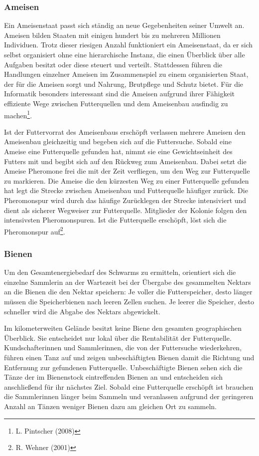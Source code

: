 \documentclass[a4paper, 11pt]{article}
\begin{document}
\subsubsection{Ameisen}
Ein Ameisenstaat passt sich ständig an neue Gegebenheiten seiner Umwelt an. Ameisen bilden Staaten mit einigen hundert bis zu mehreren Millionen Individuen. Trotz dieser riesigen Anzahl funktioniert ein Ameisenstaat, da er sich selbst organisiert ohne eine hierarchische Instanz, die einen Überblick über alle Aufgaben besitzt oder diese steuert und verteilt. Stattdessen führen die Handlungen einzelner Ameisen im Zusammenspiel zu einem organisierten Staat, der für die Ameisen sorgt und Nahrung, Brutpflege und Schutz bietet. Für die Informatik besonders interessant sind die Ameisen aufgrund ihrer Fähigkeit effiziente Wege zwischen Futterquellen und dem Ameisenbau ausfindig zu machen\footnote{L. Pintscher (2008)}.
\par Ist der Futtervorrat des Ameisenbaus erschöpft verlassen mehrere Ameisen den Ameisenbau gleichzeitig und begeben sich auf die Futtersuche. Sobald eine Ameise eine Futterquelle gefunden hat, nimmt sie eine Gewichtseinheit des Futters mit und begibt sich auf den Rückweg zum Ameisenbau. Dabei setzt die Ameise Pheromone frei die mit der Zeit verfliegen, um den Weg zur Futterquelle zu markieren. Die Ameise die den kürzesten Weg zu einer Futterquelle gefunden hat legt die Strecke zwischen Ameisenbau und Futterquelle häufiger zurück.  Die Pheromonspur wird durch das häufige Zurücklegen der Strecke intensiviert und dient als sicherer Wegweiser zur Futterquelle. Mitglieder der Kolonie folgen den intensivsten Pheromonspuren. Ist die Futterquelle erschöpft, löst sich die Pheromonspur auf\footnote{R. Wehner (2001)}.
\subsubsection{Bienen}
Um den Gesamtenergiebedarf des Schwarms zu ermitteln, orientiert sich die einzelne Sammlerin an der Wartezeit bei der Übergabe des gesammelten Nektars an die Bienen die den Nektar speichern: Je voller die Futterspeicher, desto länger müssen die Speicherbienen nach leeren Zellen suchen. Je leerer die Speicher, desto schneller wird die Abgabe des Nektars abgewickelt.
\par Im kilometerweiten Gelände besitzt keine Biene den gesamten geographischen Überblick. Sie entscheidet nur lokal über die Rentabilität der Futterquelle. Kundschafterinnen und Sammlerinnen, die von der Futtersuche wiederkehren, führen einen Tanz auf und zeigen unbeschäftigten Bienen damit die Richtung und Entfernung zur gefundenen Futterquelle. Unbeschäftigte Bienen sehen sich die Tänze der im Bienenstock eintreffenden Bienen an und entscheiden sich anschließend für ihr nächstes Ziel. Sobald eine Futterquelle erschöpft ist brauchen die Sammlerinnen länger beim Sammeln und veranlassen aufgrund der geringeren Anzahl an Tänzen weniger Bienen dazu am gleichen Ort zu sammeln.
\newpage
\end{document}
